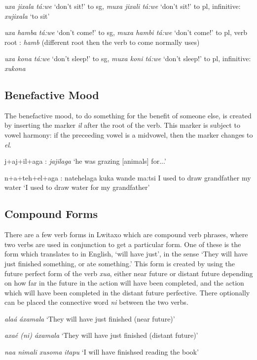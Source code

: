 \begin{wrdex}
\item \emph{uxa jixala t\'a:we} `don't sit!' to sg, \emph{muxa jixali t\'a:we} `don't sit!' to pl, infinitive: \emph{xujixala} `to sit'
\item \emph{uxa hamba t\'a:we} `don't come!' to sg, \emph{muxa hambi t\'a:we} `don't come!' to pl, verb root : \emph{hamb} (different root then the verb to come normally uses)
\item \emph{uxa kona t\'a:we} `don't sleep!' to sg, \emph{muxa koni t\'a:we} `don't sleep!' to pl, infinitive: \emph{xukona}
\end{wrdex}

\subsection{Benefactive Mood}
The benefactive mood, to do something for the benefit of someone else, is created by inserting the marker \emph{il} after the root of the verb.  This marker is subject to vowel harmony: if the preceeding vowel is a midvowel, then the marker changes to \emph{el}.\\
\begin{wrdex}
\item j+aj+il+a\engma{}ga : \emph{jajila\engma{}ga} `he was grazing [animals] for...'
\item n+a+teh+el+a\engma{}ga : 
\gll natehela\engma{}ga kuka wand\ezh{}e ma:tsi
{I used to draw} grandfather my water
\glt `I used to draw water for my grandfather'
\glend
\end{wrdex}

\subsection{Compound Forms}
There are a few verb forms in Lwitaxo which are compound verb phrases, where two verbs are used in conjunction to get a particular form.  One of these is the form which translates to in English, `will have just', in the sense `They will have just finished something, or ate something.'  This form is created by using the future perfect form of the verb \emph{xu\beta{}a}, either near future or distant future depending on how far in the future in the action will have been completed, and the action which will have been completed in the distant future perfective.  There optionally can be placed the connective word \emph{ni} between the two verbs.
\begin{wrdex}
\item \emph{\beta{}ala\beta{}\'a \beta{}\'axamala}  `They will have just finished (near future)'
\item \emph{\beta{}axa\beta{}\'e (ni) \beta{}\'axamala} `They will have just finished (distant future)'
\item \emph{na\beta{}a nimali xusoma \esh{}itapu} `I will have finishsed reading the book'
\end{wrdex}

